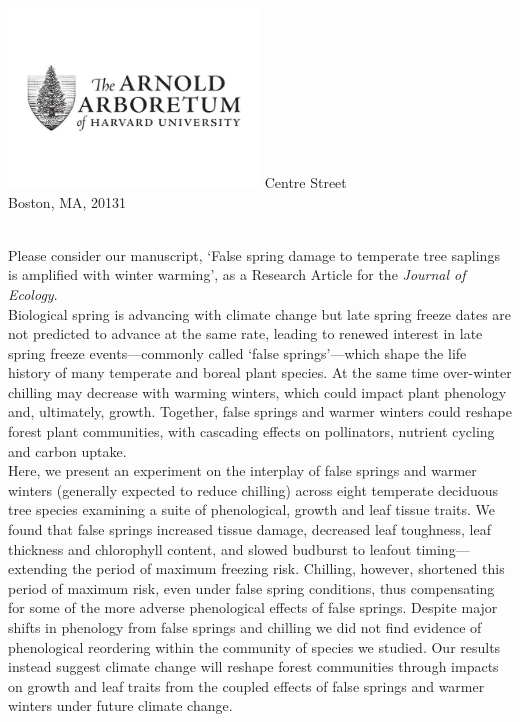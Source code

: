 \documentclass[11pt,a4paper]{article}
\begin{document}
\includegraphics[width=0.5\textwidth, right]{AA_logo.jpg}
 Centre Street\\
\noindent Boston, MA, 20131\\

\vspace{1.5ex}


\vspace{3ex}\\
\noindent Please consider our manuscript, `False spring damage to temperate tree saplings is amplified with winter warming', as a Research Article for the \textit{Journal of Ecology}. \\

\noindent Biological spring is advancing with climate change but late spring freeze dates are not predicted to advance at the same rate, leading to renewed interest in late spring freeze events---commonly called `false springs'---which shape the life history of many temperate and boreal plant species. At the same time over-winter chilling may decrease with warming winters, which could impact plant phenology and, ultimately, growth. Together, false springs and warmer winters could reshape forest plant communities, with cascading effects on pollinators, nutrient cycling and carbon uptake.  \\ %

\noindent Here, we present an experiment on the interplay of false springs and warmer winters (generally expected to reduce chilling) across eight temperate deciduous tree species examining a suite of phenological, growth and leaf tissue traits. We found that false springs increased tissue damage, decreased leaf toughness, leaf thickness and chlorophyll content, and slowed budburst to leafout timing---extending the period of maximum freezing risk. Chilling, however, shortened this period of maximum risk, even under false spring conditions, thus compensating for some of the more adverse phenological effects of false springs. Despite major shifts in phenology from false springs and chilling we did not find evidence of phenological reordering within the community of species we studied. Our results instead suggest climate change will reshape forest communities through impacts on growth and leaf traits from the coupled effects of false springs and warmer winters under future climate change.\\
\end{document}
